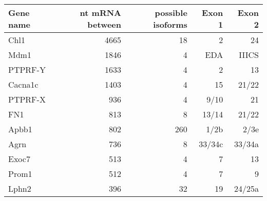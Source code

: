 \small
\begin{tabular}{   | l                        | r                          | r               | r                         |r|}

\hline 
\textbf{Gene name} & \textbf{nt mRNA between} & \textbf{possible isoforms} & \textbf{Exon 1} & \textbf{Exon 2} \\ \hline 
Chl1               & 4665                     & 18                         & 2               & 24              \\ \hline 
Mdm1               & 1846                     & 4                          & EDA             & IIICS           \\ \hline 
PTPRF-Y            & 1633                     & 4                          & 2               & 13              \\ \hline 
Cacna1c            & 1403                     & 4                          & 15              & 21/22           \\ \hline 
PTPRF-X            & 936                      & 4                          & 9/10            & 21              \\ \hline 
FN1                & 813                      & 8                          & 13/14           & 21/22           \\ \hline 
Apbb1              & 802                      & 260                        & 1/2b            & 2/3e            \\ \hline 
Agrn               & 736                      & 8                          & 33/34c          & 33/34a          \\ \hline 
Exoc7              & 513                      & 4                          & 7               & 13              \\ \hline 
Prom1              & 512                      & 4                          & 7               & 9               \\ \hline 
Lphn2              & 396                      & 32                         & 19              & 24/25a          \\ \hline 
  \end{tabular}

